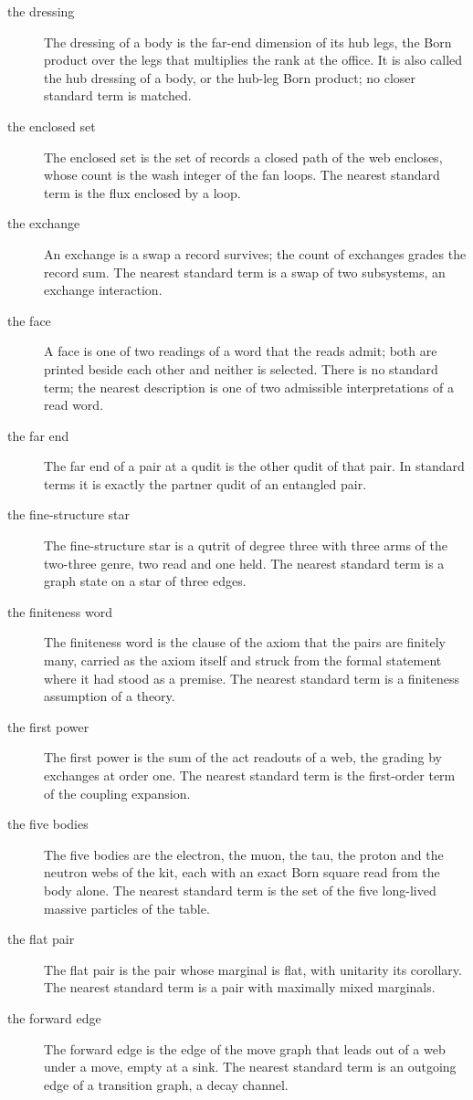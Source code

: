 \begin{description}
\item[the dressing] The dressing of a body is the far-end dimension of its hub legs, the Born product over the legs that multiplies the rank at the office. It is also called the hub dressing of a body, or the hub-leg Born product; no closer standard term is matched.
\item[the enclosed set] The enclosed set is the set of records a closed path of the web encloses, whose count is the wash integer of the fan loops. The nearest standard term is the flux enclosed by a loop.
\item[the exchange] An exchange is a swap a record survives; the count of exchanges grades the record sum. The nearest standard term is a swap of two subsystems, an exchange interaction.
\item[the face] A face is one of two readings of a word that the reads admit; both are printed beside each other and neither is selected. There is no standard term; the nearest description is one of two admissible interpretations of a read word.
\item[the far end] The far end of a pair at a qudit is the other qudit of that pair. In standard terms it is exactly the partner qudit of an entangled pair.
\item[the fine-structure star] The fine-structure star is a qutrit of degree three with three arms of the two-three genre, two read and one held. The nearest standard term is a graph state on a star of three edges.
\item[the finiteness word] The finiteness word is the clause of the axiom that the pairs are finitely many, carried as the axiom itself and struck from the formal statement where it had stood as a premise. The nearest standard term is a finiteness assumption of a theory.
\item[the first power] The first power is the sum of the act readouts of a web, the grading by exchanges at order one. The nearest standard term is the first-order term of the coupling expansion.
\item[the five bodies] The five bodies are the electron, the muon, the tau, the proton and the neutron webs of the kit, each with an exact Born square read from the body alone. The nearest standard term is the set of the five long-lived massive particles of the table.
\item[the flat pair] The flat pair is the pair whose marginal is flat, with unitarity its corollary. The nearest standard term is a pair with maximally mixed marginals.
\item[the forward edge] The forward edge is the edge of the move graph that leads out of a web under a move, empty at a sink. The nearest standard term is an outgoing edge of a transition graph, a decay channel.

\end{description}
